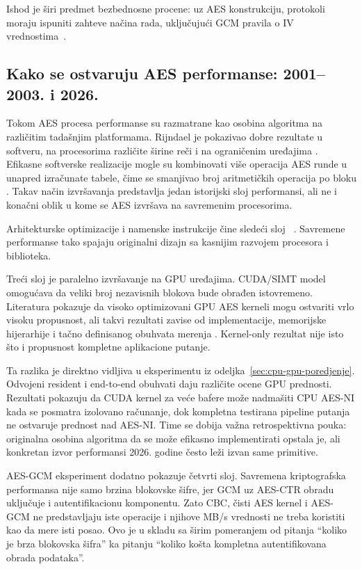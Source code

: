 Ishod je širi predmet bezbednosne procene: uz AES konstrukciju,
protokoli moraju ispuniti zahteve načina rada, uključujući GCM pravila
o IV vrednostima~\cite{nist_sp80038d}.

\subsection{Kako se ostvaruju AES performanse: 2001--2003. i 2026.}

Tokom AES procesa performanse su razmatrane kao osobina algoritma na
različitim tadašnjim platformama. Rijndael je pokazivao dobre rezultate
u softveru, na procesorima različite širine reči i na ograničenim
uređajima \cite{nechvatal2001aes}. Efikasne softverske realizacije mogle
su kombinovati više operacija AES runde u unapred izračunate tabele,
čime se smanjivao broj aritmetičkih operacija po bloku
\cite{daemen2002rijndael}. Takav način izvršavanja predstavlja jedan
istorijski sloj performansi, ali ne i konačni oblik u kome se AES
izvršava na savremenim procesorima.

Arhitekturske optimizacije i namenske instrukcije čine sledeći sloj
~\cite{gueron2012aesni}. Savremene performanse tako spajaju originalni
dizajn sa kasnijim razvojem procesora i biblioteka.

Treći sloj je paralelno izvršavanje na GPU uređajima. CUDA/SIMT model
omogućava da veliki broj nezavisnih blokova bude obrađen istovremeno.
Literatura pokazuje da visoko optimizovani GPU AES kerneli mogu ostvariti
vrlo visoku propusnost, ali takvi rezultati zavise od implementacije,
memorijske hijerarhije i tačno definisanog obuhvata merenja
\cite{tezcan2021gpu}. Kernel-only rezultat nije isto što i propusnost
kompletne aplikacione putanje.

Ta razlika je direktno vidljiva u eksperimentu iz
odeljka~\ref{sec:cpu-gpu-poredjenje}. Odvojeni resident i end-to-end obuhvati daju različite ocene GPU prednosti. Rezultati pokazuju da CUDA kernel za veće
bafere može nadmašiti CPU AES-NI kada se posmatra izolovano računanje,
dok kompletna testirana pipeline putanja ne ostvaruje prednost nad
AES-NI. Time se dobija važna retrospektivna pouka: originalna osobina
algoritma da se može efikasno implementirati opstala je, ali konkretan
izvor performansi 2026. godine često leži izvan same primitive.

AES-GCM eksperiment dodatno pokazuje četvrti sloj. Savremena
kriptografska performansa nije samo brzina blokovske šifre, jer GCM uz
AES-CTR obradu uključuje i autentifikacionu komponentu. Zato CBC, čisti
AES kernel i AES-GCM ne predstavljaju iste operacije i njihove MB/s
vrednosti ne treba koristiti kao da mere isti posao. Ovo je u skladu sa
širim pomeranjem od pitanja ``koliko je brza blokovska šifra'' ka
pitanju ``koliko košta kompletna autentifikovana obrada podataka''.

